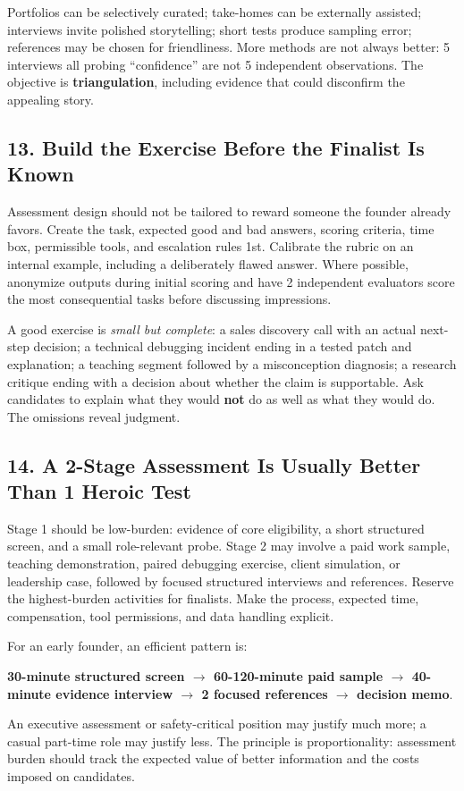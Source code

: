Portfolios can be selectively curated; take-homes can be externally assisted; interviews invite polished storytelling; short tests produce sampling error; references may be chosen for friendliness. More methods are not always better: 5 interviews all probing ``confidence'' are not 5 independent observations. The objective is \textbf{triangulation}, including evidence that could disconfirm the appealing story.

\subsection*{13. Build the Exercise Before the Finalist Is Known}

Assessment design should not be tailored to reward someone the founder already favors. Create the task, expected good and bad answers, scoring criteria, time box, permissible tools, and escalation rules 1st. Calibrate the rubric on an internal example, including a deliberately flawed answer. Where possible, anonymize outputs during initial scoring and have 2 independent evaluators score the most consequential tasks before discussing impressions.

A good exercise is \textit{small but complete}: a sales discovery call with an actual next-step decision; a technical debugging incident ending in a tested patch and explanation; a teaching segment followed by a misconception diagnosis; a research critique ending with a decision about whether the claim is supportable. Ask candidates to explain what they would \textbf{not} do as well as what they would do. The omissions reveal judgment.

\subsection*{14. A 2-Stage Assessment Is Usually Better Than 1 Heroic Test}

Stage 1 should be low-burden: evidence of core eligibility, a short structured screen, and a small role-relevant probe. Stage 2 may involve a paid work sample, teaching demonstration, paired debugging exercise, client simulation, or leadership case, followed by focused structured interviews and references. Reserve the highest-burden activities for finalists. Make the process, expected time, compensation, tool permissions, and data handling explicit.

For an early founder, an efficient pattern is:
\begin{center}
\textbf{30-minute structured screen $\to$ 60-120-minute paid sample $\to$ 40-minute evidence interview $\to$ 2 focused references $\to$ decision memo}.
\end{center}
An executive assessment or safety-critical position may justify much more; a casual part-time role may justify less. The principle is proportionality: assessment burden should track the expected value of better information and the costs imposed on candidates.
